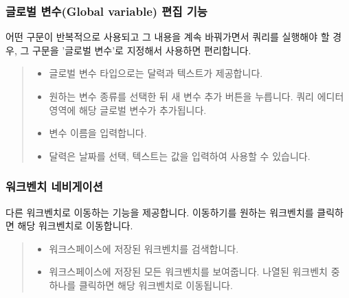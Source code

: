 \documentclass[letterpaper,10pt,english]{sphinxmanual}
\begin{document}
\subsubsection{글로벌 변수(Global variable) 편집 기능}
\label{\detokenize{discovery/part06/06_03-use_a_workbench:global-variable}}\label{\detokenize{discovery/part06/06_03-use_a_workbench:id9}}
어떤 구문이 반복적으로 사용되고 그 내용을 계속 바꿔가면서 쿼리를 실행해야 할 경우, 그 구문을 '글로벌 변수'로 지정해서 사용하면 편리합니다.
\begin{quote}

\begin{figure}[H]
\centering

\noindent{}
\end{figure}
\begin{itemize}
\item {} 
 글로벌 변수 타입으로는 달력과 텍스트가 제공합니다.

\item {} 
 원하는 변수 종류를 선택한 뒤 새 변수 추가 버튼을 누릅니다. 쿼리 에디터 영역에 해당 글로벌 변수가 추가됩니다.

\item {} 
 변수 이름을 입력합니다.

\item {} 
 달력은 날짜를 선택, 텍스트는 값을 입력하여 사용할 수 있습니다.

\end{itemize}
\end{quote}


\subsubsection{워크벤치 네비게이션}
\label{\detokenize{discovery/part06/06_03-use_a_workbench:workbench-navigation}}\label{\detokenize{discovery/part06/06_03-use_a_workbench:id10}}
다른 워크벤치로 이동하는 기능을 제공합니다. 이동하기를 원하는 워크벤치를 클릭하면 해당 워크벤치로 이동합니다.
\begin{quote}

\begin{figure}[H]
\centering

\noindent{}
\end{figure}
\begin{itemize}
\item {} 
 워크스페이스에 저장된 워크벤치를 검색합니다.

\item {} 
 워크스페이스에 저장된 모든 워크벤치를 보여줍니다. 나열된 워크벤치 중 하나를 클릭하면 해당 워크벤치로 이동됩니다.

\end{itemize}
\end{quote}
\end{document}

